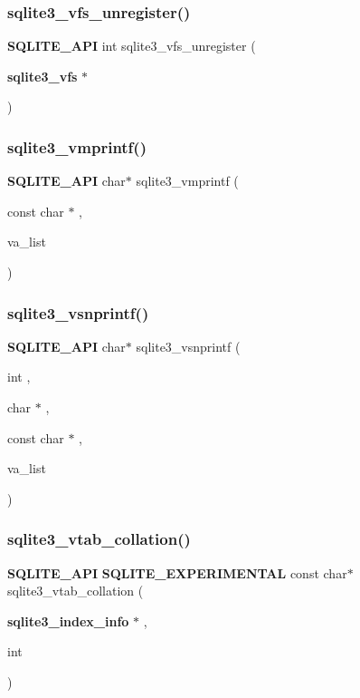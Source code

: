 \subsubsection{sqlite3\_vfs\_unregister()}
{\footnotesize\ttfamily \textbf{ S\+Q\+L\+I\+T\+E\+\_\+\+A\+PI} int sqlite3\+\_\+vfs\+\_\+unregister (\begin{DoxyParamCaption}\item[{\textbf{ sqlite3\+\_\+vfs} $\ast$}]{ }\end{DoxyParamCaption})}

\mbox{\label{sqlite3_8h_ac240de67ddf003828f16a6d9dd3fa3ca}} 
\subsubsection{sqlite3\_vmprintf()}
{\footnotesize\ttfamily \textbf{ S\+Q\+L\+I\+T\+E\+\_\+\+A\+PI} char$\ast$ sqlite3\+\_\+vmprintf (\begin{DoxyParamCaption}\item[{const char $\ast$}]{,  }\item[{va\+\_\+list}]{ }\end{DoxyParamCaption})}

\mbox{\label{sqlite3_8h_a095af9d57b6df1b95a77df71b9bce062}} 
\subsubsection{sqlite3\_vsnprintf()}
{\footnotesize\ttfamily \textbf{ S\+Q\+L\+I\+T\+E\+\_\+\+A\+PI} char$\ast$ sqlite3\+\_\+vsnprintf (\begin{DoxyParamCaption}\item[{int}]{,  }\item[{char $\ast$}]{,  }\item[{const char $\ast$}]{,  }\item[{va\+\_\+list}]{ }\end{DoxyParamCaption})}

\mbox{\label{sqlite3_8h_a69fe889ef71b00a0c2e66cedc8f89064}} 
\subsubsection{sqlite3\_vtab\_collation()}
{\footnotesize\ttfamily \textbf{ S\+Q\+L\+I\+T\+E\+\_\+\+A\+PI} \textbf{ S\+Q\+L\+I\+T\+E\+\_\+\+E\+X\+P\+E\+R\+I\+M\+E\+N\+T\+AL} const char$\ast$ sqlite3\+\_\+vtab\+\_\+collation (\begin{DoxyParamCaption}\item[{\textbf{ sqlite3\+\_\+index\+\_\+info} $\ast$}]{,  }\item[{int}]{ }\end{DoxyParamCaption})}

